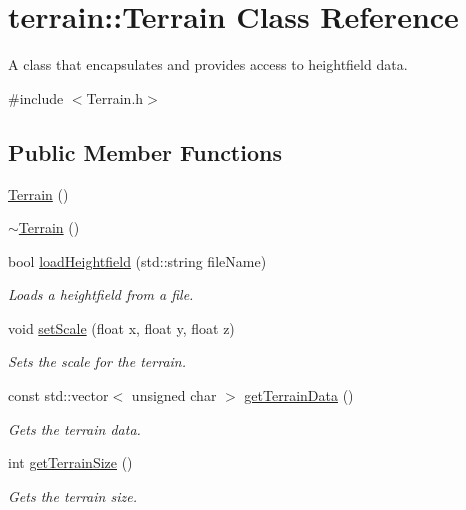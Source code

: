 \hypertarget{classterrain_1_1_terrain}{}\section{terrain\+:\+:Terrain Class Reference}
\label{classterrain_1_1_terrain}


A class that encapsulates and provides access to heightfield data.  




{\ttfamily \#include $<$Terrain.\+h$>$}

\subsection*{Public Member Functions}
\begin{DoxyCompactItemize}
\item 
\hyperlink{classterrain_1_1_terrain_a7160a06ab07a86ed97d23374405e8ef6}{Terrain} ()
\item 
\hyperlink{classterrain_1_1_terrain_a2f7f0a2aee54886324ccf48a6f321de0}{$\sim$\+Terrain} ()
\item 
bool \hyperlink{classterrain_1_1_terrain_a78fd3ff3280a84237b48bc0758e4e572}{load\+Heightfield} (std\+::string file\+Name)
\begin{DoxyCompactList}\small\item\em Loads a heightfield from a file. \end{DoxyCompactList}\item 
void \hyperlink{classterrain_1_1_terrain_ac8b30526c9ecb219966226dfecac60b7}{set\+Scale} (float x, float y, float z)
\begin{DoxyCompactList}\small\item\em Sets the scale for the terrain. \end{DoxyCompactList}\item 
const std\+::vector$<$ unsigned char $>$ \hyperlink{classterrain_1_1_terrain_adb4e1c2dd8084464fb8ada79c940bec3}{get\+Terrain\+Data} ()
\begin{DoxyCompactList}\small\item\em Gets the terrain data. \end{DoxyCompactList}\item 
int \hyperlink{classterrain_1_1_terrain_aa94bb1fa7864913b23a61fc621b3b3ef}{get\+Terrain\+Size} ()
\begin{DoxyCompactList}\small\item\em Gets the terrain size. \end{DoxyCompactList}\item 

\end{DoxyCompactItemize}
